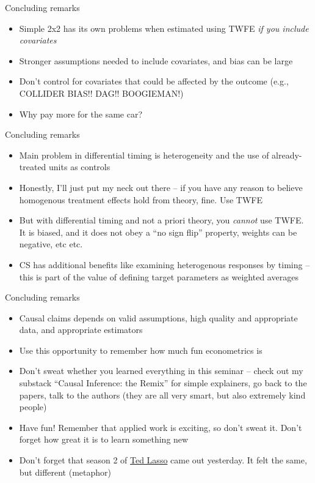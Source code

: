 \documentclass{beamer}
\begin{document}
\begin{frame}{Concluding remarks}

\begin{itemize}
\item Simple 2x2 has its own problems when estimated using TWFE \emph{if you include covariates}
\item Stronger assumptions needed to include covariates, and bias can be large
\item Don't control for covariates that could be affected by the outcome (e.g., COLLIDER BIAS!! DAG!! BOOGIEMAN!)
\item Why pay more for the same car?
\end{itemize}

\end{frame}

\begin{frame}{Concluding remarks}

\begin{itemize}
\item Main problem in differential timing is heterogeneity and the use of already-treated units as controls
\item Honestly, I'll just put my neck out there -- if you have any reason to believe homogenous treatment effects hold from theory, fine.  Use TWFE
\item But with differential timing and not a priori theory, you \emph{cannot} use TWFE.  It is biased, and it does not obey a ``no sign flip'' property, weights can be negative, etc etc.
\item CS has additional benefits like examining heterogenous responses by timing -- this is part of the value of defining target parameters as weighted averages
\end{itemize}

\end{frame}

\begin{frame}{Concluding remarks}

\begin{itemize}
\item Causal claims depends on valid assumptions, high quality and appropriate data, and appropriate estimators
\item Use this opportunity to remember how much fun econometrics is
\item Don't sweat whether you learned everything in this seminar -- check out my substack ``Causal Inference: the Remix'' for simple explainers, go back to the papers, talk to the authors (they are all very smart, but also extremely kind people)
\item Have fun!  Remember that applied work is exciting, so don't sweat it.  Don't forget how great it is to learn something new
\item Don't forget that season 2 of \underline{Ted Lasso} came out yesterday.  It felt the same, but different (metaphor)
\end{itemize}

\end{frame}
\end{document}
